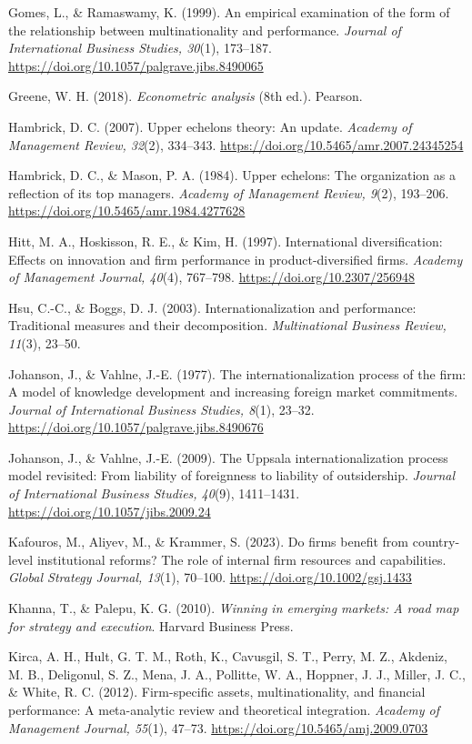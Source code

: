 \documentclass[12pt,a4paper]{article}
\begin{document}
Gomes, L., \& Ramaswamy, K. (1999). An empirical examination of the form
of the relationship between multinationality and performance.
\emph{Journal of International Business Studies, 30}(1), 173--187.
\url{https://doi.org/10.1057/palgrave.jibs.8490065}

Greene, W. H. (2018). \emph{Econometric analysis} (8th ed.). Pearson.

Hambrick, D. C. (2007). Upper echelons theory: An update. \emph{Academy
of Management Review, 32}(2), 334--343.
\url{https://doi.org/10.5465/amr.2007.24345254}

Hambrick, D. C., \& Mason, P. A. (1984). Upper echelons: The
organization as a reflection of its top managers. \emph{Academy of
Management Review, 9}(2), 193--206.
\url{https://doi.org/10.5465/amr.1984.4277628}

Hitt, M. A., Hoskisson, R. E., \& Kim, H. (1997). International
diversification: Effects on innovation and firm performance in
product-diversified firms. \emph{Academy of Management Journal, 40}(4),
767--798. \url{https://doi.org/10.2307/256948}

Hsu, C.-C., \& Boggs, D. J. (2003). Internationalization and
performance: Traditional measures and their decomposition.
\emph{Multinational Business Review, 11}(3), 23--50.

Johanson, J., \& Vahlne, J.-E. (1977). The internationalization process
of the firm: A model of knowledge development and increasing foreign
market commitments. \emph{Journal of International Business Studies,
8}(1), 23--32. \url{https://doi.org/10.1057/palgrave.jibs.8490676}

Johanson, J., \& Vahlne, J.-E. (2009). The Uppsala internationalization
process model revisited: From liability of foreignness to liability of
outsidership. \emph{Journal of International Business Studies, 40}(9),
1411--1431. \url{https://doi.org/10.1057/jibs.2009.24}

Kafouros, M., Aliyev, M., \& Krammer, S. (2023). Do firms benefit from
country-level institutional reforms? The role of internal firm resources
and capabilities. \emph{Global Strategy Journal, 13}(1), 70--100.
\url{https://doi.org/10.1002/gsj.1433}

Khanna, T., \& Palepu, K. G. (2010). \emph{Winning in emerging markets:
A road map for strategy and execution}. Harvard Business Press.

Kirca, A. H., Hult, G. T. M., Roth, K., Cavusgil, S. T., Perry, M. Z.,
Akdeniz, M. B., Deligonul, S. Z., Mena, J. A., Pollitte, W. A., Hoppner,
J. J., Miller, J. C., \& White, R. C. (2012). Firm-specific assets,
multinationality, and financial performance: A meta-analytic review and
theoretical integration. \emph{Academy of Management Journal, 55}(1),
47--73. \url{https://doi.org/10.5465/amj.2009.0703}
\end{document}
